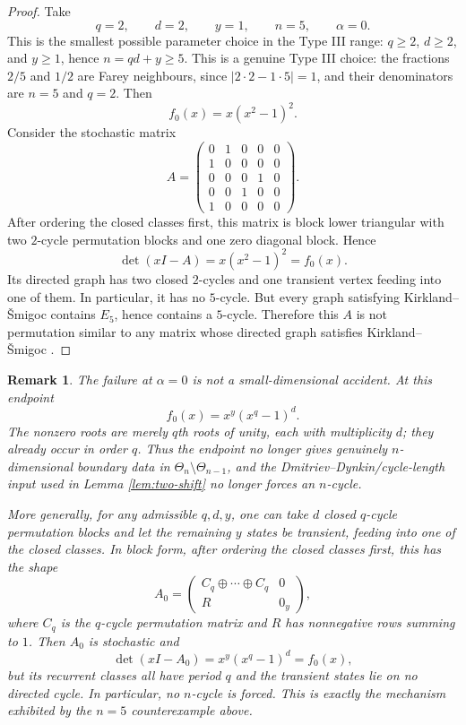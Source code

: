 \documentclass[11pt]{article}
\numberwithin{equation}{section}
\newtheorem{remark}[theorem]{Remark}
\begin{document}
\begin{proof}
Take
\[
        q=2,
        \qquad d=2,
        \qquad y=1,
        \qquad n=5,
        \qquad \alpha=0.
\]
This is the smallest possible parameter choice in the Type III range:
$q\ge2$, $d\ge2$, and $y\ge1$, hence $n=qd+y\ge5$.
This is a genuine Type III choice: the fractions $2/5$ and $1/2$ are Farey
neighbours, since $|2\cdot2-1\cdot5|=1$, and their denominators are $n=5$
and $q=2$.
Then
\[
        f_0(x)=x(x^2-1)^2.
\]
Consider the stochastic matrix
\[
        A=
        \begin{pmatrix}
        0&1&0&0&0\\
        1&0&0&0&0\\
        0&0&0&1&0\\
        0&0&1&0&0\\
        1&0&0&0&0
        \end{pmatrix}.
\]
After ordering the closed classes first, this matrix is block lower
triangular with two $2$-cycle permutation blocks and one zero diagonal block.
Hence
\[
        \det(xI-A)=x(x^2-1)^2=f_0(x).
\]
Its directed graph has two closed $2$-cycles and one transient vertex feeding
into one of them. In particular, it has no $5$-cycle. But every graph
satisfying Kirkland--\v{S}migoc \cite[Proposition 7.1]{KirklandSmigoc}
contains $E_5$, hence contains a $5$-cycle. Therefore this $A$ is not
permutation similar to any matrix whose directed graph satisfies
Kirkland--\v{S}migoc \cite[Proposition 7.1]{KirklandSmigoc}.
\end{proof}

\begin{remark}
The failure at $\alpha=0$ is not a small-dimensional accident. At this endpoint
\[
        f_0(x)=x^y(x^q-1)^d.
\]
The nonzero roots are merely $q$th roots of unity, each with multiplicity $d$;
they already occur in order $q$. Thus the endpoint no longer gives genuinely
$n$-dimensional boundary data in $\Theta_n\setminus\Theta_{n-1}$, and the
Dmitriev--Dynkin/cycle-length input used in Lemma \ref{lem:two-shift} no
longer forces an $n$-cycle.

More generally, for any admissible $q,d,y$, one can take $d$ closed
$q$-cycle permutation blocks and let the remaining $y$ states be transient,
feeding into one of the closed classes. In block form, after ordering the
closed classes first, this has the shape
\[
        A_0=
        \begin{pmatrix}
        C_q\oplus\cdots\oplus C_q & 0\\
        R & 0_y
        \end{pmatrix},
\]
where $C_q$ is the $q$-cycle permutation matrix and $R$ has nonnegative rows
summing to $1$. Then $A_0$ is stochastic and
\[
        \det(xI-A_0)=x^y(x^q-1)^d=f_0(x),
\]
but its recurrent classes all have period $q$ and the transient states lie on
no directed cycle. In particular, no $n$-cycle is forced. This is exactly the
mechanism exhibited by the $n=5$ counterexample above.
\end{remark}
\end{document}
